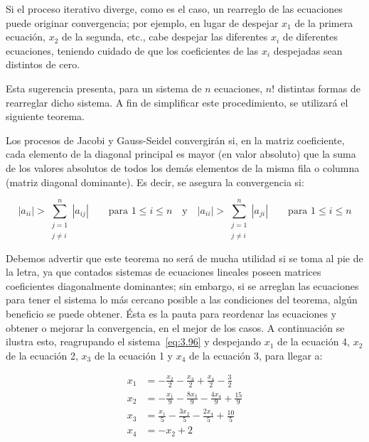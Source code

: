 \documentclass[12pt,letterpaper]{article}
\theoremstyle{definition}
\theoremstyle{plain}
\theoremstyle{remark}
\begin{document}
Si el proceso iterativo diverge, como es el caso, un rearreglo de las ecuaciones puede originar convergencia; por ejemplo, en lugar de despejar $x_1$ de la primera ecuación, $x_2$ de la segunda, etc., cabe despejar las diferentes $x_i$ de diferentes ecuaciones, teniendo cuidado de que los coeficientes de las $x_i$ despejadas sean distintos de cero.

Esta sugerencia presenta, para un sistema de $n$ ecuaciones, $n!$ distintas formas de rearreglar dicho sistema. A fin de simplificar este procedimiento, se utilizará el siguiente teorema.

\begin{tcolorbox}[title=Teorema 1. Convergencia de Método Iterativo,colframe=cyan!70!black,colback=cyan!5!white]
Los procesos de Jacobi y Gauss-Seidel convergirán si, en la matriz coeficiente, cada elemento de la diagonal principal es mayor (en valor absoluto) que la suma de los valores absolutos de todos los demás elementos de la misma fila o columna (matriz diagonal dominante). Es decir, se asegura la convergencia si:

\[
|a_{ii}| > \sum_{\substack{j=1 \\ j \ne i}}^{n} |a_{ij}| \qquad \text{para } 1 \leq i \leq n
\quad \text{y} \quad
|a_{ii}| > \sum_{\substack{j=1 \\ j \ne i}}^{n} |a_{ji}| \qquad \text{para } 1 \leq i \leq n
\tag{17}
\label{eq:3.97}
\]
\end{tcolorbox}

Debemos advertir que este teorema no será de mucha utilidad si se toma al pie de la letra, ya que contados sistemas de ecuaciones lineales poseen matrices coeficientes diagonalmente dominantes; sin embargo, si se arreglan las ecuaciones para tener el sistema lo más cercano posible a las condiciones del teorema, algún beneficio se puede obtener. Ésta es la pauta para reordenar las ecuaciones y obtener o mejorar la convergencia, en el mejor de los casos. A continuación se ilustra esto, reagrupando el sistema~\eqref{eq:3.96} y despejando $x_1$ de la ecuación 4, $x_2$ de la ecuación 2, $x_3$ de la ecuación 1 y $x_4$ de la ecuación 3, para llegar a:

\[
\begin{aligned}
x_1 &= -\frac{x_2}{2} - \frac{x_3}{2} + \frac{x_4}{2} - \frac{3}{2} \\
x_2 &= -\frac{x_1}{9} - \frac{8x_3}{9} - \frac{4x_4}{9} + \frac{15}{9} \\
x_3 &= \frac{x_1}{5} - \frac{3x_2}{5} - \frac{2x_4}{5} + \frac{10}{5} \\
x_4 &= -x_2 + 2
\end{aligned}
\]
\end{document}
